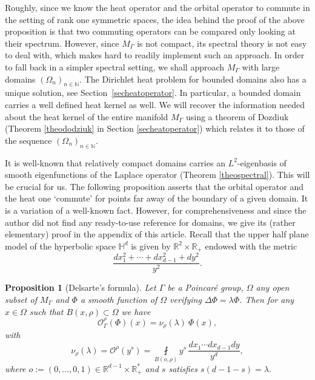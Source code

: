 \documentclass[JEP,XML,SOM,Unicode,NoFloatCountersInSection,published]{cedram}
\let\mathcal\mathscr
\theoremstyle{plain}
\newtheorem{proposition}[equation]{Proposition}
\theoremstyle{definition}
\newcommand{\RR}{\mathbb{R}}
\newcommand{\NN}{\mathbb{N}}
\newcommand{\finte}[3]{\underset{#1}{\fint} {#2} \, {#3}}
\begin{document}
Roughly, since we know the heat operator and the orbital operator to commute in the setting of rank one symmetric spaces, the idea behind the proof of the above proposition is that two commuting operators can be compared only looking at their spectrum. However, since $M_{\Gamma}$ is not compact, its spectral theory is not easy to deal with, which makes hard to readily implement such an approach. In order to fall back in a simpler spectral setting, we shall approach $M_{\Gamma}$ with large domains $(\Omega_n)_{n \in \NN}$. The Dirichlet heat problem for bounded domains also has a unique solution, see Section~\ref{secheatoperator}. In particular, a bounded domain carries a well defined heat kernel as well. We will recover the information needed about the heat kernel of the entire manifold $M_{\Gamma}$ using a theorem of Dozdiuk (Theorem \ref{theododziuk} in Section \ref{secheatoperator}) which relates it to those of the sequence $(\Omega_n)_{n \in \NN}$.

It is well-known that relatively compact domains carries an $L^2$-eigenbasis of smooth eigenfunctions of the Laplace operator (Theorem \ref{theospectral}). This will be crucial for us. The following proposition asserts that the orbital operator and the heat one `commute' for points far away of the boundary of a given domain. It is a variation of a well-known fact. However, for comprehensiveness and since the author did not find any ready-to-use reference for domains, we give its (rather elementary) proof in the appendix of this article. Recall that the upper half plane model of the hyperbolic space $\mathbb{H}^d$ is given by $\RR^{2} \times \RR_+$ endowed with the metric
\[
\frac{dx^2_1 +\cdots + dx^2_{d-1} + dy^2}{y^{2}}.
\]
\begin{proposition}[Delsarte's formula]
\label{propselbergtransform}
Let $\Gamma$ be a Poincaré group, $\Omega$ any open subset of $M_{\Gamma}$ and $\Phi$ a smooth function of $\Omega$ verifying $\Delta \Phi = \lambda \Phi$. Then for any $x \in \Omega$ such that $B(x,\rho) \subset \Omega$ we have
\begin{equation*}
\mathcal{O}_{\Gamma}^{\rho}(\Phi)(x) = \nu_{\rho}(\lambda) \ \Phi(x),
\end{equation*}
with
\begin{equation}
\label{eqformuleexplicit}
\nu_{\rho}(\lambda) = \mathcal{O}^{\rho}(y^s) = \finte{B(o,\rho)}{ y^s}{ \frac{dx_1\cdots dx_{d-1} dy}{y^d}},
\end{equation}
where $o := (0,\dots, 0, 1) \in \RR^{d-1} \times \RR_+^*$ and $s$ satisfies $s(d-1-s) = \lambda$.
\end{proposition}
\end{document}
